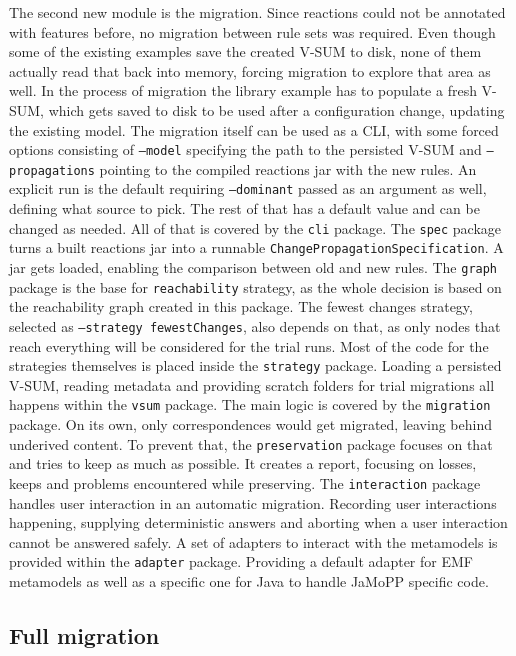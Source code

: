 The second new module is the migration.
Since reactions could not be annotated with features before, no migration between rule sets was required.
Even though some of the existing examples save the created V-SUM to disk, none of them actually read that back into memory, forcing migration to explore that area as well.
In the process of migration the library example has to populate a fresh V-SUM, which gets saved to disk to be used after a configuration change, updating the existing model.
The migration itself can be used as a CLI, with some forced options consisting of \texttt{--model} specifying the path to the persisted V-SUM and \texttt{--propagations} pointing to the compiled reactions jar with the new rules.
An explicit run is the default requiring \texttt{--dominant} passed as an argument as well, defining what source to pick.
The rest of that has a default value and can be changed as needed.
All of that is covered by the \texttt{cli} package.
The \texttt{spec} package turns a built reactions jar into a runnable \texttt{ChangePropagationSpecification}.
A jar gets loaded, enabling the comparison between old and new rules.
The \texttt{graph} package is the base for \texttt{reachability} strategy, as the whole decision is based on the reachability graph created in this package.
The fewest changes strategy, selected as \texttt{--strategy fewestChanges}, also depends on that, as only nodes that reach everything will be considered for the trial runs.
Most of the code for the strategies themselves is placed inside the \texttt{strategy} package.
Loading a persisted V-SUM, reading metadata and providing scratch folders for trial migrations all happens within the \texttt{vsum} package.
The main logic is covered by the \texttt{migration} package.
On its own, only correspondences would get migrated, leaving behind underived content.
To prevent that, the \texttt{preservation} package focuses on that and tries to keep as much as possible.
It creates a report, focusing on losses, keeps and problems encountered while preserving.
The \texttt{interaction} package handles user interaction in an automatic migration.
Recording user interactions happening, supplying deterministic answers and aborting when a user interaction cannot be answered safely.
A set of adapters to interact with the metamodels is provided within the \texttt{adapter} package.
Providing a default adapter for EMF metamodels as well as a specific one for Java to handle JaMoPP specific code.

\subsection{Full migration}
\label{sec:Implementation:Migration:FullMigration}

